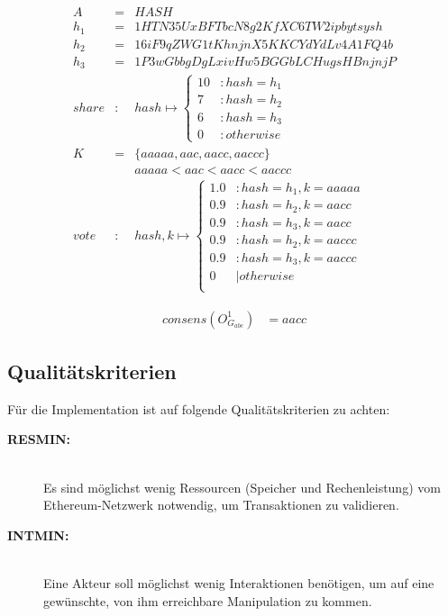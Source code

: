 \documentclass[a4paper,12pt]{report}
\begin{document}
\begin{eqnarray}
  A &=& HASH\\
  h_1 &=& 1HTN35UxBFTbcN8g2KfXC6TW2ipbytsysh\\
  h_2 &=& 16iF9qZWG1tKhnjnX5KKCYdYdLv4A1FQ4b\\
  h_3 &=& 1P3wGbbgDgLxivHw5BGGbLCHugsHBnjnjP\\
  share&:& hash\mapsto 
  \begin{cases}
    10 &: hash = h_1 \\
    7 &: hash = h_2 \\
    6 &: hash = h_3 \\
    0 &: otherwise
  \end{cases} \\
  K &=& \{aaaaa, aac, aacc, aaccc\} \\
  && aaaaa < aac < aacc < aaccc \\
  vote&:& hash,k\mapsto
  \begin{cases}
    1.0 &: hash = h_1, k = aaaaa \\
    0.9 &: hash = h_2, k = aacc \\
    0.9 &: hash = h_3, k = aacc \\
    0.9 &: hash = h_2, k = aaccc \\
    0.9 &: hash = h_3, k = aaccc \\
    0 &| otherwise \\
  \end{cases}
\end{eqnarray}
\label{daoExDef}

\begin{eqnarray}
consens(O_{G_{abc}}^1) &= aacc
\end{eqnarray}


\subsection{Qualitätskriterien}
\label{quality}

Für die Implementation ist auf folgende Qualitätskriterien zu achten:

\begin{description} 
  \item[\textbf{RESMIN:}]\hfill \\
    Es sind möglichst wenig Ressourcen (Speicher und Rechenleistung) vom Ethereum-Netzwerk notwendig, um Transaktionen zu validieren.
  \item[\textbf{INTMIN:}]\hfill \\
    Eine Akteur soll möglichst wenig Interaktionen benötigen, um auf eine gewünschte, von ihm erreichbare Manipulation zu kommen.
\end{description}
\end{document}
